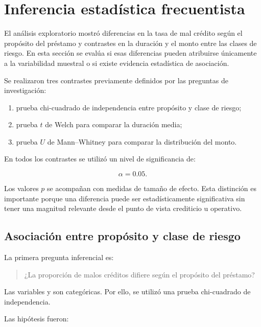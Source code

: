 \section{Inferencia estadística frecuentista}
\label{sec:inferencia}

El análisis exploratorio mostró diferencias en la tasa de mal crédito
según el propósito del préstamo y contrastes en la duración y el monto
entre las clases de riesgo. En esta sección se evalúa si esas diferencias
pueden atribuirse únicamente a la variabilidad muestral o si existe
evidencia estadística de asociación.

Se realizaron tres contrastes previamente definidos por las preguntas de
investigación:

\begin{enumerate}
    \item prueba chi-cuadrado de independencia entre propósito y clase de
    riesgo;

    \item prueba \(t\) de Welch para comparar la duración media;

    \item prueba \(U\) de Mann--Whitney para comparar la distribución del
    monto.
\end{enumerate}

En todos los contrastes se utilizó un nivel de significancia de:

\[
\alpha=0.05.
\]

Los valores \(p\) se acompañan con medidas de tamaño de efecto. Esta
distinción es importante porque una diferencia puede ser estadísticamente
significativa sin tener una magnitud relevante desde el punto de vista
crediticio u operativo.

\subsection{Asociación entre propósito y clase de riesgo}

La primera pregunta inferencial es:

\begin{quote}
    ¿La proporción de malos créditos difiere según el propósito del
    préstamo?
\end{quote}

Las variables  y
 son categóricas. Por ello, se utilizó una prueba
chi-cuadrado de independencia.

Las hipótesis fueron:


